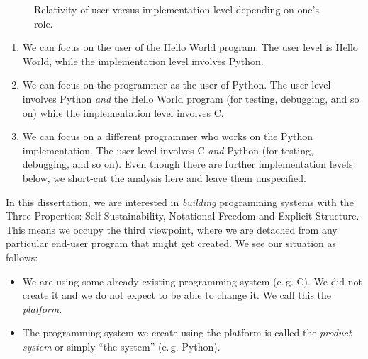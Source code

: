 \documentclass[ twoside,openright,titlepage,numbers=noenddot,headinclude,footinclude,cleardoublepage=empty,abstract=on,
                BCOR=5mm,paper=a4,fontsize=11pt
                ]{scrreprt}
\newcommand{\eg}{e.\,g.}
\providecommand{\tightlist}{}\newenvironment{longtable}[2]{\begin{tabular}}{\end{tabular}}
\theoremstyle{definition}
\begin{document}
\begin{figure}
{
 }
\caption[Relativity of user vs. implementation levels]{Relativity of user versus implementation level depending on one's role.}
\label{fig:user-impl-examples}
\end{figure}

\begin{enumerate}
\def\labelenumi{\arabic{enumi}.}
\tightlist
\item
  We can focus on the user of the Hello World program. The user level is
  Hello World, while the implementation level involves Python.
\item
  We can focus on the programmer as the user of Python. The user level
  involves Python \emph{and} the Hello World program (for testing,
  debugging, and so on) while the implementation level involves C.
\item
  We can focus on a different programmer who works on the Python
  implementation. The user level involves C \emph{and} Python (for
  testing, debugging, and so on). Even though there are further
  implementation levels below, we short-cut the analysis here and leave
  them unspecified.
\end{enumerate}

In this dissertation, we are interested in \emph{building} programming
systems with the Three Properties: Self-Sustainability, Notational
Freedom and Explicit Structure. This means we occupy the third
viewpoint, where we are detached from any particular end-user program
that might get created. We see our situation as follows:

\begin{itemize}
\tightlist
\item
  We are using some already-existing programming system (\eg{} C). We
  did not create it and we do not expect to be able to change it. We
  call this the \emph{platform}.
\item
  The programming system we create using the platform is called the
  \emph{product system} or simply ``the system'' (\eg{} Python).
\end{itemize}
\end{document}
